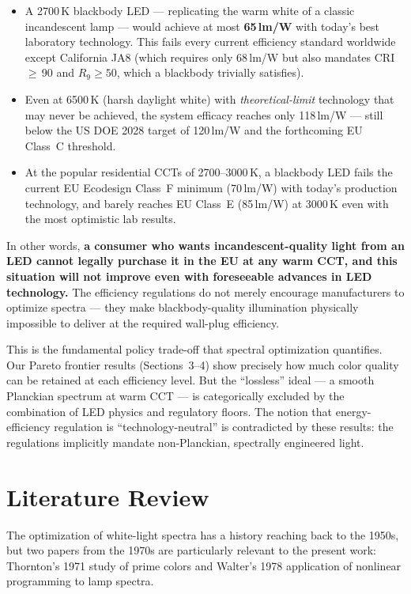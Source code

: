 \documentclass[11pt]{article}
\begin{document}
\begin{itemize}
\item A 2700\,K blackbody LED --- replicating the warm white of a
  classic incandescent lamp --- would achieve at most \textbf{65\,lm/W}
  with today's best laboratory technology.  This fails every current
  efficiency standard worldwide except California JA8 (which requires
  only 68\,lm/W but also mandates CRI\,$\geq$\,90 and $R_9 \geq 50$,
  which a blackbody trivially satisfies).

\item Even at 6500\,K (harsh daylight white) with \emph{theoretical-limit}
  technology that may never be achieved, the system efficacy reaches only
  118\,lm/W --- still below the US DOE 2028 target of 120\,lm/W and the
  forthcoming EU Class~C threshold.

\item At the popular residential CCTs of 2700--3000\,K, a blackbody
  LED fails the current EU Ecodesign Class~F minimum (70\,lm/W) with
  today's production technology, and barely reaches EU Class~E
  (85\,lm/W) at 3000\,K even with the most optimistic lab results.
\end{itemize}

\noindent
In other words, \textbf{a consumer who wants incandescent-quality light
from an LED cannot legally purchase it in the EU at any warm CCT, and
this situation will not improve even with foreseeable advances in LED
technology.}  The efficiency regulations do not merely encourage
manufacturers to optimize spectra --- they make blackbody-quality
illumination physically impossible to deliver at the required wall-plug
efficiency.

This is the fundamental policy trade-off that spectral optimization
quantifies.  Our Pareto frontier results (Sections~3--4) show precisely
how much color quality can be retained at each efficiency level.  But
the ``lossless'' ideal --- a smooth Planckian spectrum at warm CCT ---
is categorically excluded by the combination of LED physics and
regulatory floors.  The notion that energy-efficiency regulation is
``technology-neutral'' is contradicted by these results: the regulations
implicitly mandate non-Planckian, spectrally engineered light.

\section{Literature Review}

The optimization of white-light spectra has a history reaching back to
the 1950s, but two papers from the 1970s are particularly relevant to the
present work: Thornton's 1971 study of prime colors and Walter's 1978
application of nonlinear programming to lamp spectra.
\end{document}
